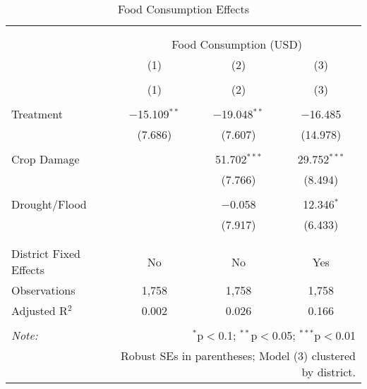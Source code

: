 
\begin{table}[!htbp] \centering 
  \caption{Food Consumption Effects} 
  \label{} 
\begin{tabular}{@{\extracolsep{5pt}}lccc} 
\\[-1.8ex]\hline 
\hline \\[-1.8ex] 
\\[-1.8ex] & \multicolumn{3}{c}{Food Consumption (USD)} \\ 
 & (1) & (2) & (3) \\ 
\\[-1.8ex] & (1) & (2) & (3)\\ 
\hline \\[-1.8ex] 
 Treatment & $-$15.109$^{**}$ & $-$19.048$^{**}$ & $-$16.485 \\ 
  & (7.686) & (7.607) & (14.978) \\ 
  & & & \\ 
 Crop Damage &  & 51.702$^{***}$ & 29.752$^{***}$ \\ 
  &  & (7.766) & (8.494) \\ 
  & & & \\ 
 Drought/Flood &  & $-$0.058 & 12.346$^{*}$ \\ 
  &  & (7.917) & (6.433) \\ 
  & & & \\ 
\hline \\[-1.8ex] 
District Fixed Effects & No & No & Yes \\ 
Observations & 1,758 & 1,758 & 1,758 \\ 
Adjusted R$^{2}$ & 0.002 & 0.026 & 0.166 \\ 
\hline 
\hline \\[-1.8ex] 
\textit{Note:}  & \multicolumn{3}{r}{$^{*}$p$<$0.1; $^{**}$p$<$0.05; $^{***}$p$<$0.01} \\ 
 & \multicolumn{3}{r}{Robust SEs in parentheses; Model (3) clustered by district.} \\ 
\end{tabular} 
\end{table} 
